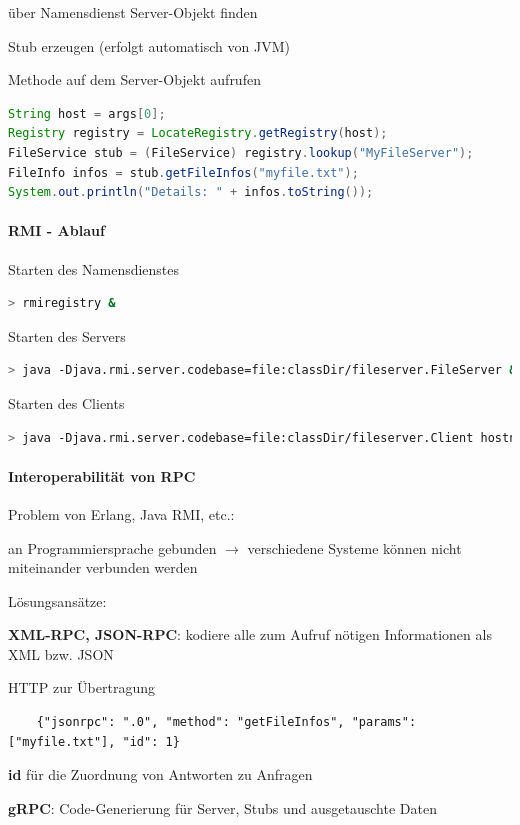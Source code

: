 \documentclass[10pt]{article}
\begin{document}
\begin{itemize*}
  \item über Namensdienst Server-Objekt finden
  \item Stub erzeugen (erfolgt automatisch von JVM)
  \item Methode auf dem Server-Objekt aufrufen
\end{itemize*}
\begin{lstlisting}[language=java]
String host = args[0];
Registry registry = LocateRegistry.getRegistry(host);
FileService stub = (FileService) registry.lookup("MyFileServer");
FileInfo infos = stub.getFileInfos("myfile.txt");
System.out.println("Details: " + infos.toString());
\end{lstlisting}

\paragraph{RMI - Ablauf}
Starten des Namensdienstes
\begin{lstlisting}[language=bash]
> rmiregistry &
\end{lstlisting}
Starten des Servers
\begin{lstlisting}[language=bash]
> java -Djava.rmi.server.codebase=file:classDir/fileserver.FileServer &
\end{lstlisting}
Starten des Clients
\begin{lstlisting}[language=bash]
> java -Djava.rmi.server.codebase=file:classDir/fileserver.Client hostname
\end{lstlisting}

\paragraph{Interoperabilität von RPC}

Problem von Erlang, Java RMI, etc.: 
\begin{itemize*}
  \item an Programmiersprache gebunden $\rightarrow$ verschiedene Systeme können nicht miteinander verbunden werden
\end{itemize*}
Lösungsansätze: 
\begin{itemize*}
  \item \textbf{XML-RPC, JSON-RPC}: kodiere alle zum Aufruf nötigen Informationen als XML bzw. JSON
  \begin{itemize*}
    \item HTTP zur Übertragung
    \begin{lstlisting}
    {"jsonrpc": ".0", "method": "getFileInfos", "params": ["myfile.txt"], "id": 1}
    \end{lstlisting}
    \item \textbf{id} für die Zuordnung von Antworten zu Anfragen
  \end{itemize*}
  \item \textbf{gRPC}: Code-Generierung für Server, Stubs und ausgetauschte Daten
\end{itemize*}
\end{document}
